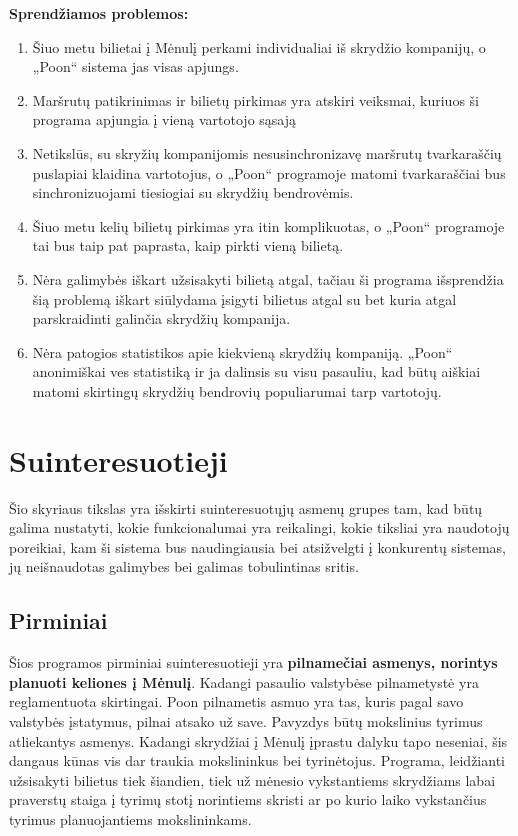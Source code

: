 \documentclass{VUMIFPSkursinis}
\begin{document}
\bigskip
\textbf{Sprendžiamos problemos: }
\begin{enumerate}
\item Šiuo metu bilietai į Mėnulį perkami individualiai iš skrydžio kompanijų, o „Poon“ sistema jas visas apjungs.
\item Maršrutų patikrinimas ir bilietų pirkimas yra atskiri veiksmai, kuriuos ši programa apjungia į vieną vartotojo sąsają
\item Netikslūs, su skryžių kompanijomis nesusinchronizavę maršrutų tvarkaraščių puslapiai klaidina vartotojus, o „Poon“ programoje matomi tvarkaraščiai bus sinchronizuojami tiesiogiai su skrydžių bendrovėmis.
\item Šiuo metu kelių bilietų pirkimas yra itin komplikuotas, o „Poon“ programoje tai bus taip pat paprasta, kaip pirkti vieną bilietą.
\item Nėra galimybės iškart užsisakyti bilietą atgal, tačiau ši programa išsprendžia šią problemą iškart siūlydama įsigyti bilietus atgal su bet kuria atgal parskraidinti galinčia skrydžių kompanija.
\item Nėra patogios statistikos apie kiekvieną skrydžių kompaniją. „Poon“ anonimiškai ves statistiką ir ja dalinsis su visu pasauliu, kad būtų aiškiai matomi skirtingų skrydžių bendrovių populiarumai tarp vartotojų.
\end{enumerate}

\section{Suinteresuotieji}
Šio skyriaus tikslas yra išskirti suinteresuotųjų asmenų grupes tam, kad būtų galima nustatyti, kokie funkcionalumai yra reikalingi, kokie tiksliai yra naudotojų poreikiai, kam ši sistema bus naudingiausia bei atsižvelgti į konkurentų sistemas, jų neišnaudotas galimybes bei galimas tobulintinas sritis.

\subsection{Pirminiai} 
Šios programos pirminiai suinteresuotieji yra \textbf{pilnamečiai asmenys, norintys planuoti keliones į Mėnulį}. Kadangi pasaulio valstybėse pilnametystė yra reglamentuota skirtingai. Poon pilnametis asmuo yra tas, kuris pagal savo valstybės įstatymus, pilnai atsako už save. Pavyzdys būtų mokslinius tyrimus atliekantys asmenys. Kadangi skrydžiai į Mėnulį įprastu dalyku tapo neseniai, šis dangaus kūnas vis dar traukia mokslininkus bei tyrinėtojus. Programa, leidžianti užsisakyti bilietus tiek šiandien, tiek už mėnesio vykstantiems skrydžiams labai praverstų staiga į tyrimų stotį norintiems skristi ar po kurio laiko vykstančius tyrimus planuojantiems mokslininkams. 
\end{document}

